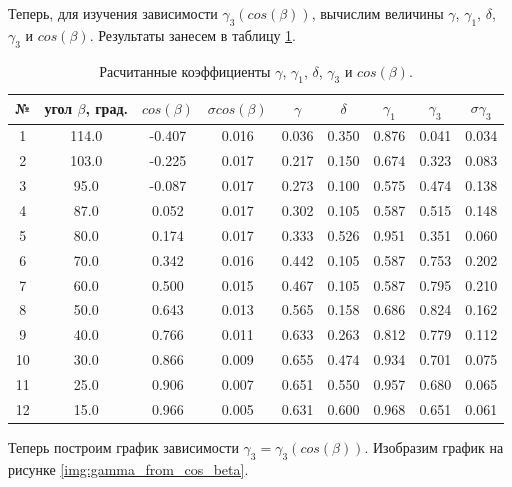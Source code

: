 \documentclass[a4paper, 12pt]{article}
\begin{document}
Теперь, для изучения зависимости $\gamma_3(cos(\beta))$, вычислим величины $\gamma$, $\gamma_1$, $\delta$, $\gamma_3$ и $cos(\beta)$. Результаты занесем в таблицу \ref{tabl:gammas}.

\begin{table}[h]
\centering
\begin{tabular}{|c|c|c|c|c|c|c|c|c|}
\hline 
    № & угол $\beta$, град. & $cos(\beta)$ & $\sigma cos(\beta)$ & $\gamma$ & $\delta$ & $\gamma_1$ & $\gamma_3$ & $\sigma \gamma_3$ \\ \hline
    1 & 114.0 & -0.407 & 0.016 & 0.036 & 0.350 & 0.876 & 0.041  & 0.034 \\ \hline
    2 & 103.0 & -0.225 & 0.017 & 0.217 & 0.150 & 0.674 & 0.323  & 0.083 \\ \hline
    3 & 95.0 & -0.087 & 0.017 & 0.273 & 0.100 & 0.575 & 0.474  & 0.138 \\ \hline
    4 & 87.0 & 0.052 & 0.017 & 0.302 & 0.105 & 0.587 & 0.515  & 0.148 \\ \hline
    5 & 80.0 & 0.174 & 0.017 & 0.333 & 0.526 & 0.951 & 0.351  & 0.060 \\ \hline
    6 & 70.0 & 0.342 & 0.016 & 0.442 & 0.105 & 0.587 & 0.753  & 0.202 \\ \hline
    7 & 60.0 & 0.500 & 0.015 & 0.467 & 0.105 & 0.587 & 0.795  & 0.210 \\ \hline
    8 & 50.0 & 0.643 & 0.013 & 0.565 & 0.158 & 0.686 & 0.824  & 0.162 \\ \hline
    9 & 40.0 & 0.766 & 0.011 & 0.633 & 0.263 & 0.812 & 0.779  & 0.112 \\ \hline
    10 & 30.0 & 0.866 & 0.009 & 0.655 & 0.474 & 0.934 & 0.701  & 0.075 \\ \hline
    11 & 25.0 & 0.906 & 0.007 & 0.651 & 0.550 & 0.957 & 0.680  & 0.065 \\ \hline
    12 & 15.0 & 0.966 & 0.005 & 0.631 & 0.600 & 0.968 & 0.651  & 0.061 \\ \hline
    
\end{tabular}
\caption{Расчитанные коэффициенты $\gamma$, $\gamma_1$, $\delta$, $\gamma_3$ и $cos(\beta)$.}
\label{tabl:gammas}
\end{table}

Теперь построим график зависимости $\gamma_3 = \gamma_3(cos(\beta))$. Изобразим график на рисунке \ref{img:gamma_from_cos_beta}.
\end{document}
